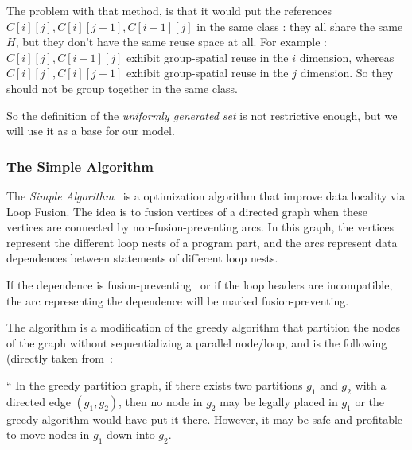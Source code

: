 \documentclass[paper=a4, fontsize=11.5pt]{scrartcl}
\numberwithin{equation}{section}        %
\numberwithin{figure}{section}          %
\numberwithin{table}{section}               %
\begin{document}
            The problem with that method, is that it would put the references
            $C[i][j],C[i][j+1],C[i-1][j]$ in the same class : they all share the
            same $H$, but they don't have the same reuse space at all.
            For example : $C[i][j],C[i-1][j]$ exhibit group-spatial reuse in the $i$ dimension,
            whereas $C[i][j],C[i][j+1]$ exhibit group-spatial reuse in the $j$ dimension. So they
            should not be group together in the same class.
            \medskip

            So the definition of the \textit{uniformly generated set} is not restrictive enough,
            but we will use it as a base for our model.



        \subsubsection{The Simple Algorithm}
            The \textit{Simple Algorithm}~\cite{Kennedy94maximizingloop} is a
            optimization algorithm that improve data locality via Loop Fusion.
            The idea is to fusion vertices of a directed graph when these vertices
            are connected by non-fusion-preventing arcs.
            In this graph, the vertices represent the different loop nests of a program part,
            and the arcs represent data dependences between statements of different loop nests.

            If the dependence is fusion-preventing~\cite{Bacon:1994:CTH:197405.197406} or if the loop headers are incompatible,
            the arc representing the dependence will be marked fusion-preventing.

            The algorithm is a modification of the greedy algorithm that partition
            the nodes of the graph without sequentializing a parallel node/loop, and
            is the following (directly taken from~\cite{Kennedy94maximizingloop}:
            \medskip

            ``  In the greedy partition graph, if there exists two partitions $g_1$
                and $g_2$ with a directed edge $(g_1,g_2)$, then no node in $g_2$
                may be legally placed in $g_1$ or the greedy algorithm would have put it
                there. However, it may be safe and profitable to move nodes in $g_1$
                down into $g_2$.
\end{document}
